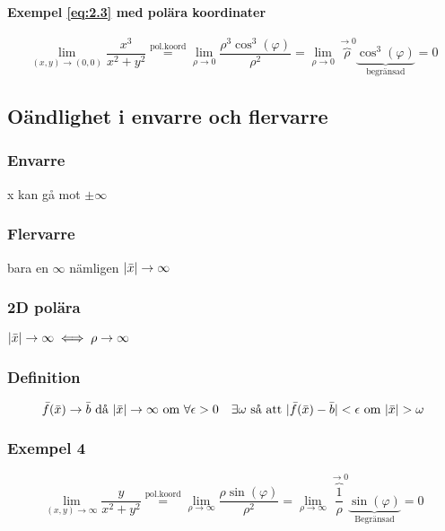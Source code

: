 \documentclass{article}
\DeclarePairedDelimiter \abs{\lvert}{\rvert}
\begin{document}
\paragraph{Exempel \eqref{eq:2.3} med polära koordinater}

\[
	\lim_{(x,y) \rightarrow (0,0)} \frac{x^3}{x^2+y^2} \overset{\mathrm{pol.koord}}{=} \lim_{\rho \rightarrow 0} \frac{\rho^3\cos^3(\varphi)}{\rho^2} = 
	\lim_{\rho \rightarrow 0} \overbrace{\rho}^{\rightarrow 0}\underbrace{\cos^3(\varphi)}_\text{begränsad} = 0
\]

\subsection{Oändlighet i envarre och flervarre}
\subsubsection*{Envarre}
x kan gå mot $\pm\infty$
\subsubsection*{Flervarre}
bara en $\infty$ nämligen $\abs{\bar{x}} \rightarrow \infty$
\subsubsection*{2D polära}
$\abs{\bar{x}} \rightarrow \infty \iff \rho \rightarrow \infty$
\subsubsection{Definition}
\[
	\bar{f}(\bar{x}) \rightarrow \bar{b} \text{ då } \abs{\bar{x}} \rightarrow \infty \text{ om } \forall \epsilon > 0 \quad \exists \omega \text{ så att } \abs{\bar{f}(\bar{x}) - \bar{b}} < \epsilon \text{ om } \abs{\bar{x}} > \omega
\]

\newpage
\subsubsection{Exempel 4}

\begin{equation} \label{eq:2.4}
	\lim_{(x,y) \rightarrow \infty} \frac{y}{x^2+y^2} \overset{\mathrm{pol.koord}}{=} \lim_{\rho \rightarrow \infty} \frac{\rho \sin(\varphi)}{\rho^2} = 
	\lim_{\rho \rightarrow \infty} \overbrace{\frac{1}{\rho}}^{\rightarrow 0} \underbrace{\sin(\varphi)}_\text{Begränsad} = 0
\end{equation}
\end{document}
